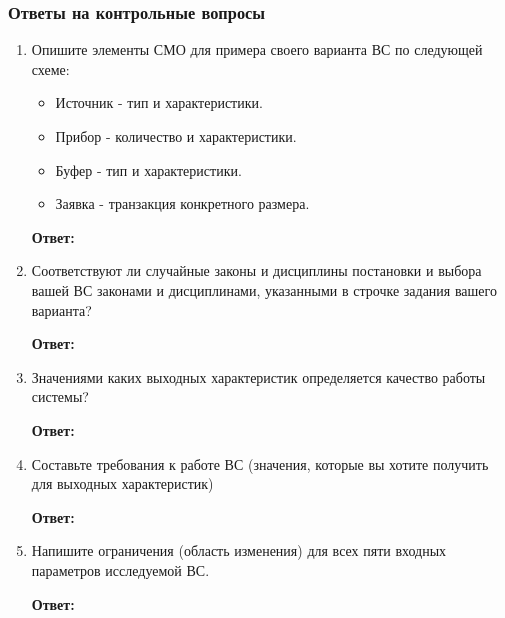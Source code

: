 \documentclass[a4paper, 14pt]{article}
\begin{document}
\subsubsection{Ответы на контрольные вопросы}

\begin{enumerate}
	\item Опишите элементы СМО для примера своего варианта ВС по следующей схеме:
	      \begin{itemize}
		      \item Источник - тип и характеристики.
		      \item Прибор - количество и характеристики.
		      \item Буфер - тип и характеристики.
		      \item Заявка - транзакция конкретного размера.
	      \end{itemize}

	      \textbf{Ответ:}
	\item Соответствуют ли случайные законы и дисциплины постановки и выбора вашей ВС законами и дисциплинами, указанными в строчке задания вашего варианта?

	      \textbf{Ответ:}
	\item Значениями каких выходных характеристик определяется качество работы системы?

	      \textbf{Ответ:}
	\item Составьте требования к работе ВС (значения, которые вы хотите получить для выходных характеристик)

	      \textbf{Ответ:}
	\item Напишите ограничения (область изменения) для всех пяти входных параметров исследуемой ВС.

	      \textbf{Ответ:}
\end{enumerate}
\end{document}
